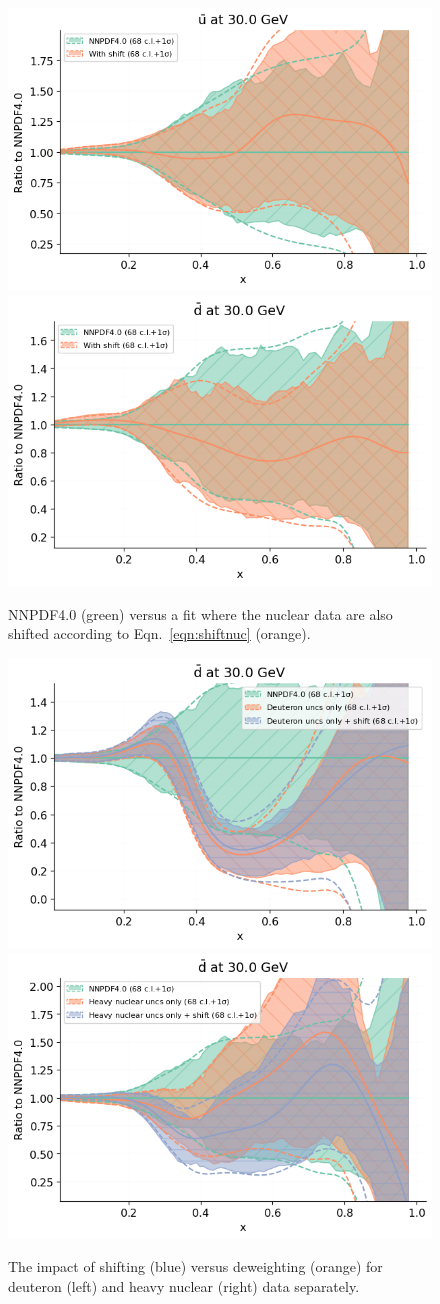 \begin{figure}[H]
  \begin{center}
      \includegraphics[width=0.49\linewidth]{nuclear/plots/ubar2.png}
     \includegraphics[width=0.49\linewidth]{nuclear/plots/dbar2.png}
    \caption{NNPDF4.0 (green) versus a fit where the nuclear data are also shifted according to Eqn.~\ref{eqn:shiftnuc} (orange).
    \label{fig:pdfs2} }
    \end{center}
\end{figure}   

\begin{figure}[H]
  \begin{center}
      \includegraphics[width=0.49\linewidth]{nuclear/plots/deutcomp.png}
     \includegraphics[width=0.49\linewidth]{nuclear/plots/nuccomp.png}
    \caption{The impact of shifting (blue) versus deweighting (orange) for deuteron (left) and heavy nuclear (right) data separately.
    \label{fig:pdfs3} }
    \end{center}
\end{figure}   


